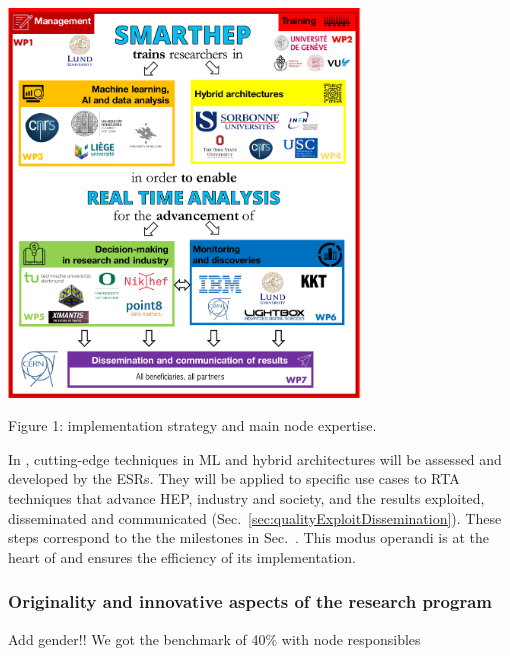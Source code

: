\begin{center}
\includegraphics[width=0.7\textwidth]{figs/NetworkCompositionCombinedImplementation} %
\begin{center}\footnotesize \label{fig:implementation}
Figure 1: \acronym implementation strategy and main node expertise.
\end{center}
\normalsize 
\vspace{-2mm}
\end{center}

In \acronym, cutting-edge techniques in ML and hybrid architectures will be assessed and developed by the ESRs. They will be applied to specific use cases to RTA techniques that advance HEP, industry and society, and the results exploited, disseminated and communicated (Sec.~\ref{sec:qualityExploitDissemination}). These steps correspond to the the milestones in Sec.~\label{sub:milestones}. This modus operandi is at the heart of \acronym and ensures the efficiency of its implementation. 

\subsubsection{Originality and innovative aspects of the research program} 
\label{sub:Originality}

Add gender!! We got the benchmark of 40\% with node responsibles

